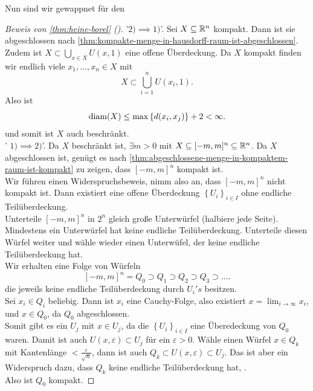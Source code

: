 Nun sind wir gewappnet für den
\begin{proof}[Beweis von \autoref{thm:heine-borel} ()]
    '$2) \implies 1)$'. Sei $X\subseteq \mathbb{R}^n$ kompakt. Dann ist sie abgeschlossen nach \ref{thm:kompakte-menge-in-hausdorff-raum-ist-abgeschlossen}.
    Zudem ist $X\subset \bigcup_{x\in X} U(x,1)$ eine offene Überdeckung. Da $X$ kompakt finden wir endlich viele  $x_1,\ldots,x_n\in X$ mit
    \[
        X \subset \bigcup_{i=1}^n U(x_i,1)
    .\] 
    Also ist
    \[
        \operatorname{diam}(X) \leq  \max \left \{d(x_i,x_j)\right\} +2 < \infty
    .\] 
    und somit ist $X$ auch beschränkt. \\
    ' $1)\implies 2)$'. Da $X$ beschränkt ist,  $\exists m>0$ mit $X\subseteq [-m,m]^n\subseteq \mathbb{R}^n$. Da $X$ abgeschlossen ist, genügt es nach \ref{thm:abgeschlossene-menge-in-kompaktem-raum-ist-kompakt} zu zeigen, dass  $[-m,m]^n$ kompakt ist. \\
    Wir führen einen Widerspruchsbeweis, nimm also an, dass  $[-m,m]^n$ nicht kompakt ist. Dann existiert eine offene Überdeckung  $\left \{U_i\right\} _{i \in I}$ ohne endliche Teilüberdeckung. \\
    Unterteile $[-m,m]^n$ in  $2^n$ gleich große Unterwürfel (halbiere jede Seite). Mindestens ein Unterwürfel hat keine endliche Teilüberdeckung. Unterteile diesen Würfel weiter und wähle wieder einen Unterwüfel, der keine endliche Teilüberdeckung hat. \\
    Wir erhalten eine Folge von Würfeln
     \[
         [-m,m]^n =     Q_0 \supset Q_1 \supset Q_2 \supset Q_3 \supset \ldots
    .\] 
    die jeweils keine endliche Teilüberdeckung durch $U_i's$ besitzen. \\
    Sei  $x_i \in Q_i$ beliebig. Dann ist $x_i$ eine Cauchy-Folge, also existiert $x = \lim_{i\to \infty} x_i$, und $x\in Q_0$, da $Q_0$ abgeschlossen. \\
    Somit gibt es ein $U_j$ mit  $x\in U_j$, da die $\left \{U_i\right\} _{i \in I}$ eine Überedeckung von $Q_0$ waren. Damit ist auch $U(x,ε) \subset U_j$ für ein $ε>0$. Wähle einen Würfel $x\in Q_k$ mit Kantenlänge $< \frac{ε}{\sqrt{n} }$, dann ist auch $Q_k \subset U(x,ε) \subset U_j$. Das ist aber ein Widerspruch dazu, dass $Q_k$ keine endliche Teilüberdeckung hat, \contra. \\
    Also ist  $Q_0$ kompakt.
\end{proof}

